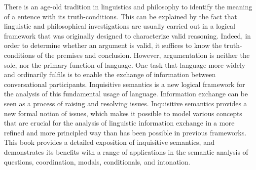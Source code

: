 There is an age-old tradition in linguistics and philosophy to identify the meaning of a entence with its truth-conditions. This can be explained by the fact that linguistic and philosophical investigations are usually carried out in a logical framework that was originally designed to characterize valid reasoning. Indeed, in order to determine whether an argument is valid, it suffices to know the truth-conditions of the premises and conclusion. However, argumentation is neither the sole, nor the primary function of language. One task that language more widely and ordinarily fulfils is to enable the exchange of information between conversational participants. Inquisitive semantics is a new logical framework for the analysis of this fundamental usage of language. Information exchange can be seen as a process of raising and resolving issues. Inquisitive semantics provides a new formal notion of issues, which makes it possible to model various concepts that are crucial for the analysis of linguistic information exchange in a more refined and more principled way than has been possible in previous frameworks. This book provides a detailed exposition of inquisitive semantics, and demonstrates its benefits with a range of applications in the semantic analysis of questions, coordination, modals, conditionals, and intonation.
\endinput